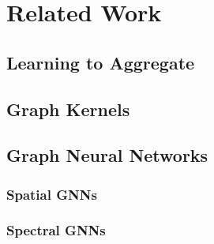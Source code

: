 \chapter{Related Work}%
\label{sec:related}

\section{Learning to Aggregate}%
\label{sec:related:lta}

\section{Graph Kernels}%
\label{sec:related:gk}

\section{Graph Neural Networks}%
\label{sec:related:gnn}

\subsection{Spatial GNNs}%
\label{sec:related:gnn:spatial}

\subsection{Spectral GNNs}%
\label{sec:related:gnn:spectral}
